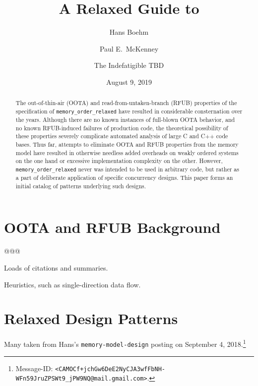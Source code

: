 \documentclass{article}
\begin{document}
\title{A Relaxed Guide to }

\newcommand{\co}[1]{\lstinline[breaklines=yes,breakatwhitespace=yes]{#1}}

\author{
Hans Boehm\\ \and
Paul E.~McKenney\\ \and
The Indefatigible TBD
}
\date{August 9, 2019}
\maketitle{}

\begin{abstract}
	The out-of-thin-air (OOTA) and read-from-untaken-branch (RFUB)
	properties of the specification of \co{memory_order_relaxed}
	have resulted in considerable consternation over the years.
	Although there are no known instances of full-blown OOTA
	behavior, and no known RFUB-induced failures of production code,
	the theoretical possibility of these properties severely
	complicate automated analysis of large C and C++ code bases.
	Thus far, attempts to eliminate OOTA and RFUB properties from
	the memory model have resulted in otherwise needless added
	overheads on weakly ordered systems on the one hand or
	excessive implementation complexity on the other.
	However, \co{memory_order_relaxed} never was intended to be used
	in arbitrary code, but rather as a part of deliberate application
	of specific concurrency designs.
	This paper forms an initial catalog of patterns underlying such
	designs.
\end{abstract}

\section{OOTA and RFUB Background}
\label{sec:OOTA and RFUB Background}

@@@

Loads of citations and summaries.

Heuristics, such as single-direction data flow.

\section{Relaxed Design Patterns}
\label{sec:Relaxed Design Patterns}

Many taken from Hans's \co{memory-model-design} posting on
September 4, 2018.\footnote{
	Message-ID: \co{<CAMOCf+jchGw6DeE2NyCJA3wfFbNH-WFn59JruZPSWt9_jPW9NQ@mail.gmail.com>}.}
\end{document}
